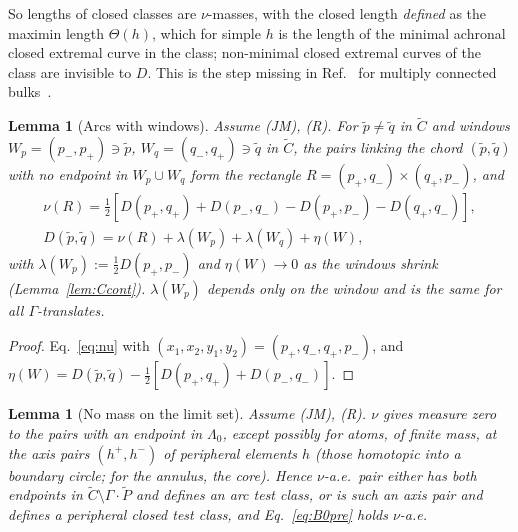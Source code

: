 \documentclass[aps,prd,onecolumn,superscriptaddress,nofootinbib,amsmath,amssymb,11pt]{revtex4-2}
\newtheorem{lemma}[theorem]{Lemma}
\theoremstyle{definition}
\newcommand{\Pt}{\tilde P}
\begin{document}
So lengths of closed classes are $\nu$-masses, with the closed length \emph{defined} as the maximin length $\Theta(h)$, which for
simple $h$ is the length of the minimal achronal closed extremal curve in the class; non-minimal closed extremal curves of the
class are invisible to $D$. This is the step missing in Ref.~\cite{CzechDong2019} for multiply connected bulks~\cite{GGHH2025}.

\begin{lemma}[Arcs with windows]\label{lem:N4}
Assume (JM), (R). For $\tilde p\ne\tilde q$ in $\tilde C$ and windows $W_p=(p_-,p_+)\ni\tilde p$, $W_q=(q_-,q_+)\ni\tilde q$ in $\tilde C$,
the pairs linking the chord $(\tilde p,\tilde q)$ with no endpoint in $W_p\cup W_q$ form the rectangle $R=(p_+,q_-)\times(q_+,p_-)$,
and
\begin{gather*}
\nu(R)=\tfrac12[D(p_+,q_+)+D(p_-,q_-)-D(p_+,p_-)-D(q_+,q_-)],\\
D(\tilde p,\tilde q)=\nu(R)+\lambda(W_p)+\lambda(W_q)+\eta(W),
\end{gather*}
with $\lambda(W_p):=\frac12D(p_+,p_-)$ and $\eta(W)\to0$ as the windows shrink (Lemma~\ref{lem:Ccont}). $\lambda(W_p)$ depends only on
the window and is the same for all $\Gamma$-translates.
\end{lemma}

\begin{proof}
Eq.~\eqref{eq:nu} with $(x_1,x_2,y_1,y_2)=(p_+,q_-,q_+,p_-)$, and
$\eta(W)=D(\tilde p,\tilde q)-\frac12[D(p_+,q_+)+D(p_-,q_-)]$.
\end{proof}

\begin{lemma}[No mass on the limit set]\label{lem:N2}
Assume (JM), (R). $\nu$ gives measure zero to the pairs with an endpoint in $\Lambda_0$, except possibly for atoms, of finite mass,
at the axis pairs $(h^+,h^-)$ of peripheral elements $h$ (those homotopic into a boundary circle; for the annulus, the core). Hence
$\nu$-a.e.\ pair either has both endpoints in $\tilde C\setminus\Gamma\cdot\Pt$ and defines an arc test class, or is such an axis pair
and defines a peripheral closed test class, and Eq.~\eqref{eq:B0pre} holds $\nu$-a.e.
\end{lemma}
\end{document}

